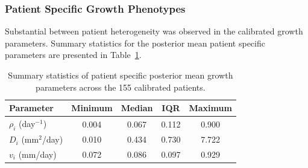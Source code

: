 \subsubsection{Patient Specific Growth Phenotypes}



Substantial between patient heterogeneity was observed in the calibrated growth parameters. Summary statistics for the posterior mean patient specific parameters are presented in Table~\ref{tab:hbm_patient_parameters}.

\begin{table}[htbp]
\centering
\caption{Summary statistics of patient specific posterior mean growth parameters across the 155 calibrated patients.}
\label{tab:hbm_patient_parameters}
\begin{tabular}{lcccc}
\hline
\textbf{Parameter} & \textbf{Minimum} & \textbf{Median} & \textbf{IQR} & \textbf{Maximum} \\
\hline
$\rho_i$ (day$^{-1}$) & 0.004 & 0.067 & 0.112 & 0.900 \\
$D_i$ (mm$^2$/day) & 0.010 & 0.434 & 0.730 & 7.722 \\
$v_i$ (mm/day) & 0.072 & 0.086 & 0.097 & 0.929 \\
\hline
\end{tabular}
\end{table}

